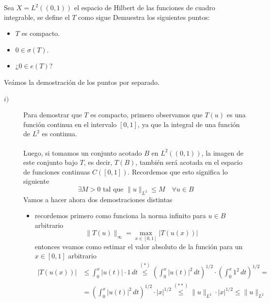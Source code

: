 \begin{ejercicio}
    Sea $X=L^2((0,1))$ el espacio de Hilbert de las funciones de cuadro integrable, se define el  $T$ como sigue
    Demuestra los siguientes puntos:
    \begin{itemize}
        \item[i)] $T$ es compacto.
        \item[ii)] $0 \in \sigma(T)$.
        \item[iii)] ¿$0 \in e(T)$?
    \end{itemize}
    Veámos la demostración de los puntos por separado.
    \begin{description}
        \item[$i)$] Para demostrar que $T$ es compacto, primero observamos que $T(u)$ es una función continua en el intervalo $[0,1]$, ya que la integral de una función de $L^2$ es continua. \\ \\
        \noindent
        Luego, si tomamos un conjunto acotado $B$ en $L^2((0,1))$, la imagen de este conjunto bajo $T$, es decir, $T(B)$, también será acotada en el espacio de funciones continuas $C([0,1])$. Recordemos que esto significa lo siguiente
        \begin{equation} \label{eq:acotacion-uniforme}
            \exists M > 0 \text{ tal que } \|u\|_{L^2} \leq M \quad \forall u \in B
        \end{equation}
        Vamos a hacer ahora dos demostraciones distintas
        \begin{itemize}
            \item {} recordemos primero como funciona la norma infinito para $u\in B$ arbitrario
            \begin{equation*}
                \|T(u)\|_ \infty = \max_{x \in [0,1]} |T(u(x))|
            \end{equation*}
            entonces veamos como estimar el valor absoluto de la función para un $x\in [0,1]$ arbitrario
            \begin{align*}
                |T(u(x))| &\leq \int_{0}^{x} |u(t)| \cdot 1\, dt \overset{(*)}{\leq}  \left( \int_{0}^{x} |u(t)|^2 \, dt \right)^{1/2} \cdot \left( \int_{0}^{x} 1^2 \, dt \right)^{1/2}= \\
                &= \left( \int_{0}^{x} |u(t)|^2 \, dt \right)^{1/2} \cdot |x|^{1/2} \overset{(**)}{\leq} \|u\|_{L^2} \cdot |x|^{1/2} \leq \|u\|_{L^2}
            \end{align*}

\end{itemize}
\end{description}
\end{ejercicio}
